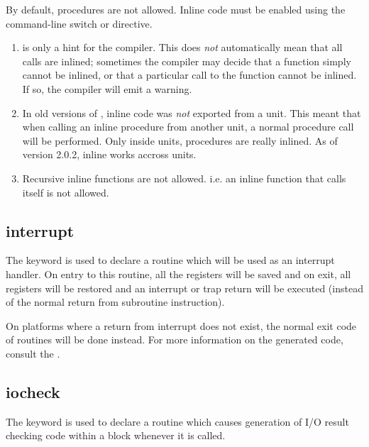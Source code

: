 By default,  procedures are not allowed. Inline code must be enabled
using the command-line switch  or 
directive.

\begin{remark}
\begin{enumerate}
\item {} is only a hint for the compiler. This does {\em not}
automatically mean that all calls are inlined; sometimes the compiler
may decide that a function simply cannot be inlined, or that a particular call
to the function cannot be inlined. If so, the compiler will emit a warning.
\item In old versions of \fpc, inline code was {\em not} exported from a unit. This
meant that when calling an inline procedure from another unit, a normal procedure 
call will be performed. Only inside units,  procedures are really inlined.
As of version 2.0.2, inline works accross units.
\item Recursive inline functions are not allowed. i.e. an inline function
that calls itself is not allowed.
\end{enumerate}
\end{remark}

\subsection{interrupt}
\label{se:interrupt}
The  keyword is used to declare a routine which will
be used as an interrupt handler. On entry to this routine, all the registers
will be saved and on exit, all registers will be restored
and an interrupt or trap return will be executed (instead of the normal return
from subroutine instruction).

On platforms where a return from interrupt does not exist, the normal exit
code of routines will be done instead. For more information on the generated
code, consult the \progref.

\subsection{iocheck}
\label{se:iocheck}
The  keyword is used to declare a routine which causes
generation of I/O result checking code within a 
block whenever it is called.

